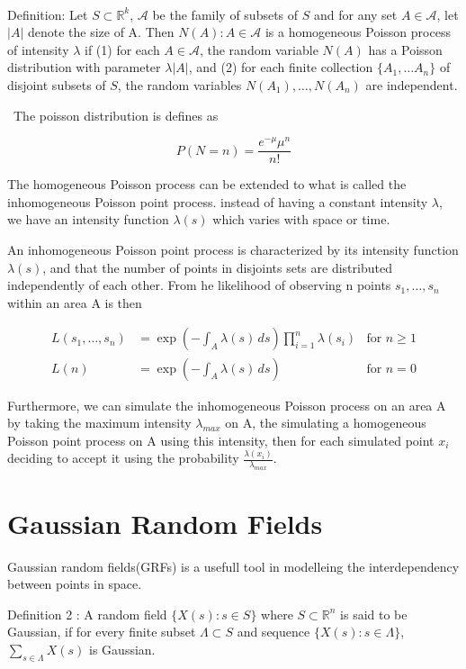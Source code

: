 \

Definition: Let $S \subset \mathbb{R}^k$, $\mathscr{A}$ be the family of subsets of $S$ and for any set $A\in \mathscr{A}$, let $|A|$ denote the size of A. Then ${N(A):A\in \mathscr{A}}$ is a homogeneous Poisson process of intensity $\lambda$ if (1) for each $A \in \mathscr{A}$, the random variable $N(A)$ has a Poisson distribution with parameter $\lambda|A|$, and (2) for each finite collection $\{ A_1, \dots A_n\}$ of disjoint subsets of $S$, the random variables $N(A_1), \dots, N(A_n)$ are independent. 

\
The poisson distribution is defines as 


$$
P(N=n) = \frac{e^{-\mu}\mu^n}{n!}
$$


The homogeneous Poisson process can be extended to what is called the inhomogeneous Poisson point process. instead of having a constant intensity $\lambda$, we have an intensity function $\lambda(s)$ which varies with space or time. 

An inhomogeneous Poisson point process is characterized by its intensity function $\lambda(s)$, and that the number of points in disjoints sets are distributed independently of each other. From he likelihood of observing n points $s_1, \dots, s_n$ within an area A is then


\[
\begin{array}{lll}
L(s_1, \dots, s_n) &= \exp\left(-\int_A \lambda(s) \, ds\right) \prod_{i=1}^n \lambda(s_i) & \text{for } n \geq 1 \\
L(n) &= \exp\left(-\int_A \lambda(s) \, ds\right) & \text{for } n = 0
\end{array}
\]



Furthermore, we can simulate the inhomogeneous Poisson process on an area A by taking the maximum intensity $\lambda_{max}$ on A, the simulating a homogeneous Poisson point process on A using this intensity, then for each simulated point $x_i$ deciding to accept it using the probability $\frac{\lambda(x_i)}{\lambda_{max}}$\cite{spatial_point_patterns}.



\section{Gaussian Random Fields}
Gaussian random fields(GRFs) is a usefull tool in modelleing the interdependency between points in space. 

Definition 2 : A random field $\{X(s):s \in S\}$ where $S\subset \mathbb{R}^n$ is said to be Gaussian, if for every finite subset $\Lambda \subset S$ and sequence $\{X(s):s\in \Lambda\}$, $\sum_{s\in \Lambda} X(s)$ is Gaussian\cite{gaetan_spatial_2010}.

